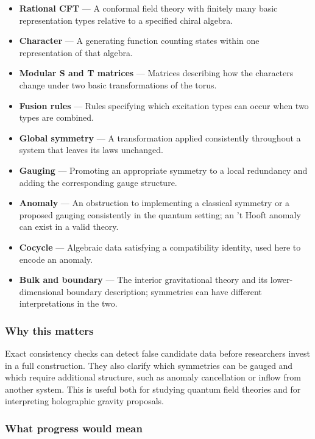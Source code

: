 \documentclass[
  11pt,
]{article}
\begin{document}
\begin{itemize}
\item
  \textbf{Rational CFT} --- A conformal field theory with finitely many
  basic representation types relative to a specified chiral algebra.
\item
  \textbf{Character} --- A generating function counting states within
  one representation of that algebra.
\item
  \textbf{Modular S and T matrices} --- Matrices describing how the
  characters change under two basic transformations of the torus.
\item
  \textbf{Fusion rules} --- Rules specifying which excitation types can
  occur when two types are combined.
\item
  \textbf{Global symmetry} --- A transformation applied consistently
  throughout a system that leaves its laws unchanged.
\item
  \textbf{Gauging} --- Promoting an appropriate symmetry to a local
  redundancy and adding the corresponding gauge structure.
\item
  \textbf{Anomaly} --- An obstruction to implementing a classical
  symmetry or a proposed gauging consistently in the quantum setting; an
  't Hooft anomaly can exist in a valid theory.
\item
  \textbf{Cocycle} --- Algebraic data satisfying a compatibility
  identity, used here to encode an anomaly.
\item
  \textbf{Bulk and boundary} --- The interior gravitational theory and
  its lower-dimensional boundary description; symmetries can have
  different interpretations in the two.
\end{itemize}

\subsubsection{Why this matters}

Exact consistency checks can detect false candidate data before
researchers invest in a full construction. They also clarify which
symmetries can be gauged and which require additional structure, such as
anomaly cancellation or inflow from another system. This is useful both
for studying quantum field theories and for interpreting holographic
gravity proposals.

\subsubsection{What progress would mean}
\end{document}
